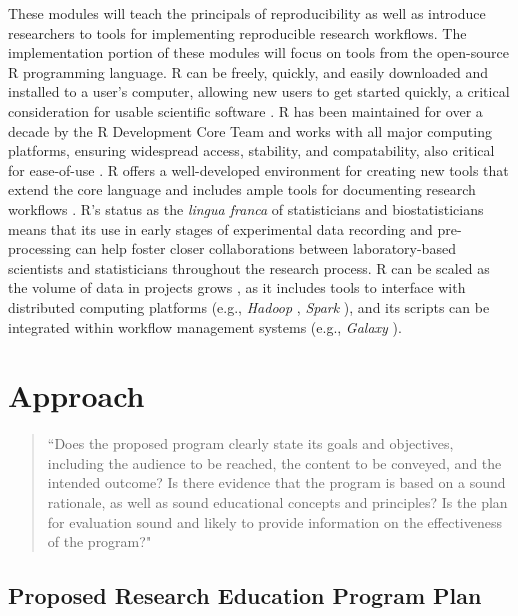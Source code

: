 \documentclass[pdftex,english,11pt,parskip=half]{scrartcl}
\begin{document}
These modules will teach the principals of reproducibility as well as introduce researchers to tools for implementing reproducible research workflows. The implementation portion of these modules will focus on tools from the open-source R programming language. R can be freely, quickly, and easily downloaded and installed to a user's computer, allowing new users to get started quickly, a critical consideration for usable scientific software \cite{list2017ten}. R has been maintained for over a decade by the R Development Core Team and works with all major computing platforms, ensuring  widespread access, stability, and compatability, also critical for ease-of-use \cite{baumer2017lessons, altschul2013anatomy}. R offers a well-developed environment for creating new tools that extend the core language \cite{wickham2015r} and includes ample tools for documenting research workflows \cite{xie2015dynamic, xie2016bookdown}. R's status as the \textit{lingua franca} of statisticians and biostatisticians means that its use in early stages of experimental data recording and pre-processing can help foster closer collaborations between laboratory-based scientists and statisticians throughout the research process. R can be scaled as the volume of data in projects grows \cite{list2017ten}, as it includes tools to interface with distributed computing platforms (e.g., \textit{Hadoop} \cite{pathak2014rhadoop}, \textit{Spark} \cite{sparklyr}), and its scripts can be integrated within workflow management systems (e.g., \textit{Galaxy} \cite{goecks2010galaxy, walker2016models}). 

\section{Approach}

\begin{quotation}
``Does the proposed program clearly state its goals and objectives, including the audience to be reached, the content to be conveyed, and the intended outcome?  Is there evidence that the program is based on a sound rationale, as well as sound educational concepts and principles? Is the plan for evaluation sound and likely to provide information on the effectiveness of the program?"
\end{quotation}

\subsection{Proposed Research Education Program Plan}
\end{document}
